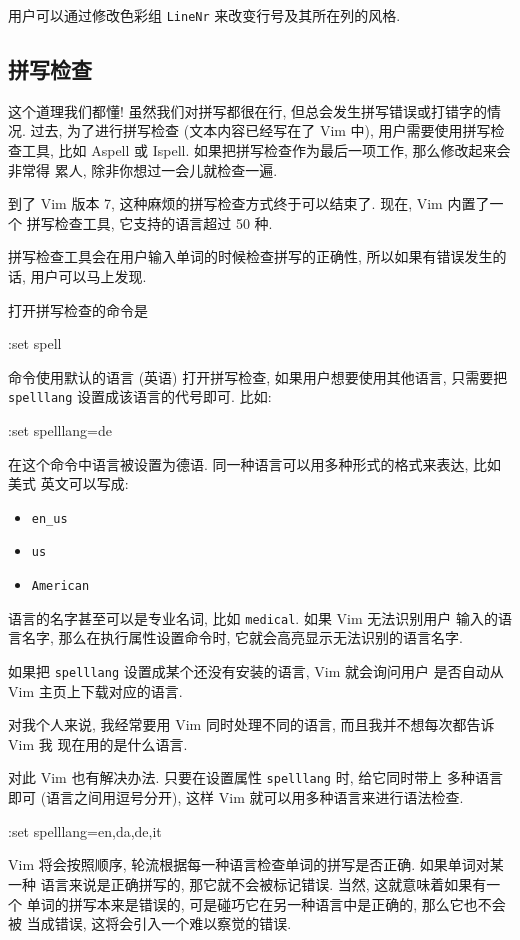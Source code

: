 \begin{warning}
    用户可以通过修改色彩组 \texttt{LineNr} 来改变行号及其所在列的风格.
\end{warning}

\subsection{拼写检查}
\label{subsec:spell_checking_your_language}

这个道理我们都懂! 虽然我们对拼写都很在行, 但总会发生拼写错误或打错字的情况.
过去, 为了进行拼写检查 (文本内容已经写在了 Vim 中), 用户需要使用拼写检查工具,
比如 Aspell 或 Ispell. 如果把拼写检查作为最后一项工作, 那么修改起来会非常得
累人, 除非你想过一会儿就检查一遍.

到了 Vim 版本 7, 这种麻烦的拼写检查方式终于可以结束了. 现在, Vim 内置了一个
拼写检查工具, 它支持的语言超过 50 种.

拼写检查工具会在用户输入单词的时候检查拼写的正确性, 所以如果有错误发生的话,
用户可以马上发现.

打开拼写检查的命令是
\begin{vimcmd}
:set spell
\end{vimcmd}
命令使用默认的语言 (英语) 打开拼写检查, 如果用户想要使用其他语言, 只需要把 
\texttt{spelllang} 设置成该语言的代号即可. 比如:
\begin{vimcmd}
:set spelllang=de
\end{vimcmd}
在这个命令中语言被设置为德语. 同一种语言可以用多种形式的格式来表达, 比如美式
英文可以写成:
\begin{itemize}
    \item \texttt{en\_us}
    \item \texttt{us}
    \item \texttt{American}
\end{itemize}

语言的名字甚至可以是专业名词, 比如 \texttt{medical}. 如果 Vim 无法识别用户
输入的语言名字, 那么在执行属性设置命令时, 它就会高亮显示无法识别的语言名字.

\begin{warning}
    如果把 \texttt{spelllang} 设置成某个还没有安装的语言, Vim 就会询问用户
    是否自动从 Vim 主页上下载对应的语言.
\end{warning}

对我个人来说, 我经常要用 Vim 同时处理不同的语言, 而且我并不想每次都告诉 Vim 我
现在用的是什么语言.

对此 Vim 也有解决办法. 只要在设置属性 \texttt{spelllang} 时, 给它同时带上
多种语言即可 (语言之间用逗号分开), 这样 Vim 就可以用多种语言来进行语法检查.
\begin{vimcmd}
:set spelllang=en,da,de,it
\end{vimcmd}
Vim 将会按照顺序, 轮流根据每一种语言检查单词的拼写是否正确. 如果单词对某一种
语言来说是正确拼写的, 那它就不会被标记错误. 当然, 这就意味着如果有一个
单词的拼写本来是错误的, 可是碰巧它在另一种语言中是正确的, 那么它也不会被
当成错误, 这将会引入一个难以察觉的错误.

